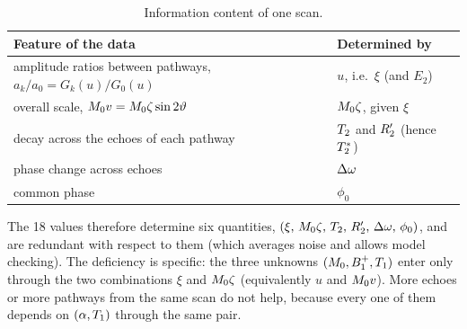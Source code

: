 \begin{table}[!htbp]
\centering
\caption{Information content of one scan.}
\label{tab:onescan}
\small
\begin{tabular}{ll}
\toprule
Feature of the data & Determined by\\
\midrule
amplitude ratios between pathways, $a_k/a_0=G_k(u)/G_0(u)$ & $u$, i.e.\ $\xi$ (and $E_2$)\\
overall scale, $M_0 v=M_0\zeta\sin2\vartheta$ & $M_0\zeta$, given $\xi$\\
decay across the echoes of each pathway & $T_2$ and $R_2'$ (hence $T_2^{*}$)\\
phase change across echoes & $\Delta\omega$\\
common phase & $\phi_0$\\
\bottomrule
\end{tabular}
\end{table}

The 18 values therefore determine six quantities, $(\xi,\,M_0\zeta,\,T_2,\,R_2',\,\Delta\omega,\,\phi_0)$, and are
redundant with respect to them (which averages noise and allows model checking). The
deficiency is specific: the three unknowns $(M_0,B_1^{+},T_1)$ enter only through the two
combinations $\xi$ and $M_0\zeta$ (equivalently $u$ and $M_0 v$). More echoes or more pathways
from the same scan do not help, because every one of them depends on $(\alpha,T_1)$ through the
same pair.

